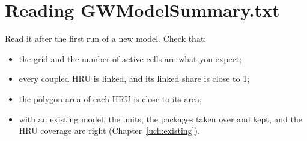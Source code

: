\section{Reading GWModelSummary.txt}
Read it after the first run of a new model. Check that:
\begin{itemize}
\item the grid and the number of active cells are what you expect;
\item every coupled HRU is linked, and its linked share is close to 1;
\item the polygon area of each HRU is close to its  area;
\item with an existing model, the units, the packages taken over and kept, and the HRU coverage are right
(Chapter~\ref{uch:existing}).
\end{itemize}

